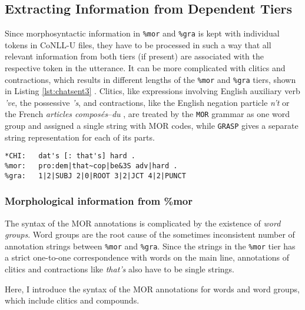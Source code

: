 \subsection{Extracting Information from Dependent Tiers}

Since morphosyntactic information in \texttt{\%mor} and \texttt{\%gra} is kept with individual tokens in CoNLL-U files, they have to be processed in such a way that all relevant information from both tiers (if present) are associated with the respective token in the utterance. It can be more complicated with clitics and contractions, which results in different lengths of the \texttt{\%mor} and \texttt{\%gra} tiers, shown in Listing \ref{lst:chatsent3} . Clitics, like expressions involving English auxiliary verb \emph{'ve}, the possessive \emph{'s}, and contractions, like the English negation particle \emph{n't} or the French \emph{articles composés}--\emph{du} , are treated by the \texttt{MOR} grammar as one word group and assigned a single string with MOR codes, while \texttt{GRASP} gives a separate string representation for each of its parts.\\

\lstset{
numbers = none,
frame = single,
}

\begin{lstlisting}[caption={Example to show the different number of strings in \texttt{\%mor} and \texttt{\&gra} tiers due to contracted form \emph{that's}.}, label={lst:chatsent3}]
*CHI:   dat's [: that's] hard .
%mor:   pro:dem|that~cop|be&3S adv|hard .
%gra:   1|2|SUBJ 2|0|ROOT 3|2|JCT 4|2|PUNCT
\end{lstlisting}

\subsubsection{Morphological information from \%mor}

The syntax of the MOR annotations is complicated by the existence of \emph{word groups}. Word groups are the root cause of the sometimes inconsistent number of annotation strings between \texttt{\%mor} and \texttt{\%gra}. Since the strings in the \texttt{\%mor} tier has a strict one-to-one correspondence with words on the main line, annotations of clitics and contractions like \emph{that's} also have to be single strings.

Here, I introduce the syntax of the MOR annotations for words and word groups, which include clitics and compounds.

